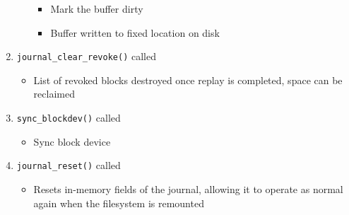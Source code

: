 \begin{enumerate}
\begin{itemize}
\begin{itemize}
			\item Mark the buffer dirty
			\item Buffer written to fixed location on disk
		\end{itemize}
	\end{itemize}
\item \texttt{journal_clear_revoke()} called
	\begin{itemize}
		\item List of revoked blocks destroyed once replay is completed, space can be reclaimed
	\end{itemize}
\item \texttt{sync_blockdev()} called
	\begin{itemize}
	\item Sync block device
	\end{itemize}
\item \texttt{journal_reset()} called
	\begin{itemize}
	\item Resets in-memory fields of the journal, allowing it to operate as normal again when the filesystem is remounted
	\end{itemize}
\end{enumerate}